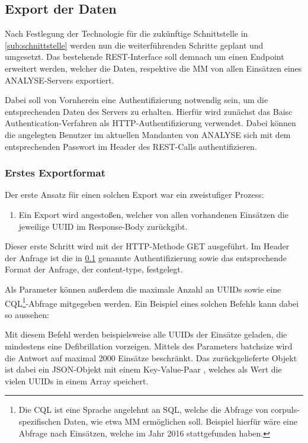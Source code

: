 \subsection{Export der Daten} %
\label{sub:export}
Nach Festlegung der Technologie für die zukünftige Schnittstelle in \ref{sub:schnittstelle} werden nun die weiterführenden Schritte geplant und umgesetzt.
Das bestehende \gls{REST}-Interface soll demnach um einen Endpoint erweitert werden, welcher die Daten, respektive die \gls{MM} von allen Einsätzen eines \gls{ANALYSE}-Servers exportiert.

Dabei soll von Vornherein eine Authentifizierung notwendig sein, um die entsprechenden Daten des Servers zu erhalten.
Hierfür wird zunächst das \glqq Baisc Authentication\grqq-Verfahren als HTTP-Authentifizierung verwendet. 
Dabei können die angelegten Benutzer im aktuellen Mandanten von \gls{ANALYSE} sich mit dem entsprechenden Passwort im Header des \gls{REST}-Calls authentifizieren.

\subsubsection{Erstes Exportformat}
\label{subsub:1stexport}
Der erste Ansatz für einen solchen Export war ein zweistufiger Prozess:
\begin{enumerate}
\item Ein Export wird angestoßen, welcher von allen vorhandenen Einsätzen die jeweilige \gls{UUID} im Response-Body zurückgibt.
\end{enumerate}

Dieser erste Schritt wird mit der HTTP-Methode \glqq GET\grqq{} ausgeführt.
Im Header der Anfrage ist die in \ref{sub:export} genannte Authentifizierung sowie das entsprechende Format der Anfrage, der \glqq content-type\grqq, festgelegt.

Als Parameter können außerdem die maximale Anzahl an UUIDs sowie eine \gls{CQL}\footnote{Die \gls{CQL} ist eine \glqq Sprache\grqq{} angelehnt an SQL, welche die Abfrage von corpuls-spezifischen Daten, wie etwa \gls{MM} ermöglichen soll. Beispiel hierfür wäre eine Abfrage nach Einsätzen, welche im Jahr 2016 stattgefunden haben.}-Abfrage mitgegeben werden.
Ein Beispiel eines solchen Befehls kann dabei so aussehen:


Mit diesem Befehl werden beispielsweise alle UUIDs der Einsätze geladen, die mindestens eine Defibrillation vorzeigen. 
Mittels des Parameters \glqq batchsize\grqq{} wird die Antwort auf maximal 2000 Einsätze beschränkt.
Das zurückgelieferte Objekt ist dabei ein JSON-Objekt mit einem Key-Value-Paar , welches als Wert die vielen \gls{UUID}s in einem Array speichert.

